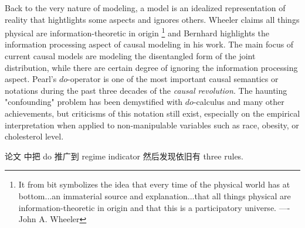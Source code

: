  
Back to the very nature of modeling, a model is an idealized representation of reality that hightlights some aspects and ignores others. Wheeler claims all things physical are information-theoretic in origin \footnote{It from bit symbolizes the idea that every time of the physical world has at bottom...an immaterial source and explanation...that all things physical are information-theoretic in origin and that this is a participatory universe. ---- John A. Wheeler} and Bernhard highlights the information processing aspect of causal modeling in his work\cite{Scholkopf2019}. The main focus of current causal models are modeling the disentangled form of the joint distribution, while there are certain degree of ignoring the information processing aspect. Pearl's $do$-operator is one of the most important causal semantics or notations during the past three decades of the \emph{causal revolution}.  The haunting "confounding" problem has been demystified with $do$-calculus and many other achievements, but criticisms of this notation still exist, especially on the empirical interpretation when applied to non-manipulable variables such as race, obesity, or cholesterol level\cite{Pearl2019do}.




论文 \cite{correacalculus} 中把 do 推广到 regime indicator 然后发现依旧有 three rules.

